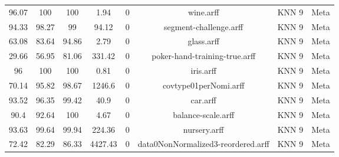 \begin{longtable}{@{\extracolsep{}}cccccccc}
96.07	&	100	&	100	&	1.94	&	0	&	 wine.arff	&	 KNN 9	&	Meta	\\
94.33	&	98.27	&	99	&	94.12	&	0	&	 segment-challenge.arff	&	 KNN 9	&	Meta	\\
63.08	&	83.64	&	94.86	&	2.79	&	0	&	 glass.arff	&	 KNN 9	&	Meta	\\
29.66	&	56.95	&	81.06	&	331.42	&	0	&	 poker-hand-training-true.arff	&	 KNN 9	&	Meta	\\
96	&	100	&	100	&	0.81	&	0	&	 iris.arff	&	 KNN 9	&	Meta	\\
70.14	&	95.82	&	98.67	&	1246.6	&	0	&	 covtype01perNomi.arff	&	 KNN 9	&	Meta	\\
93.52	&	96.35	&	99.42	&	40.9	&	0	&	 car.arff	&	 KNN 9	&	Meta	\\
90.4	&	92.64	&	100	&	4.67	&	0	&	 balance-scale.arff	&	 KNN 9	&	Meta	\\
93.63	&	99.64	&	99.94	&	224.36	&	0	&	 nursery.arff	&	 KNN 9	&	Meta	\\
72.42	&	82.29	&	86.33	&	4427.43	&	0	&	 data0NonNormalized3-reordered.arff	&	 KNN 9	&	Meta	\\
\hline
\end{longtable}
